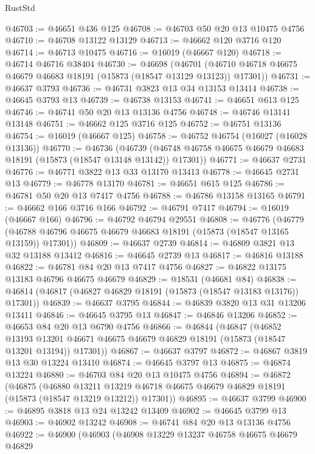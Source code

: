 \begin{lexlean}{RustStd}
\begin{coremodule}
@46703 := @46651 @436 @125
@46708 := @46703 @50 @20 @13 @10475 @4756
@46710 := @46708 @13122 @13129
@46713 := @46662 @120 @3716 @120
@46714 := @46713 @10475
@46716 := @16019 (@46667 @120)
@46718 := @46714 @46716 @38404
@46730 := @46698
    (@46701 (@46710 @46718 @46675 @46679 @46683 @18191 (@15873 (@18547 @13129 @13123)) @17301))
@46731 := @46637 @3793
@46736 := @46731 @3823 @13 @34 @13153 @13414
@46738 := @46645 @3793 @13
@46739 := @46738 @13153
@46741 := @46651 @613 @125
@46746 := @46741 @50 @20 @13 @13136 @4756
@46748 := @46746 @13141 @13148
@46751 := @46662 @125 @3716 @125
@46752 := @46751 @13136
@46754 := @16019 (@46667 @125)
@46758 := @46752 @46754 (@16027 (@16028 @13136))
@46770 := @46736
    (@46739 (@46748 @46758 @46675 @46679 @46683 @18191 (@15873 (@18547 @13148 @13142)) @17301))
@46771 := @46637 @2731
@46776 := @46771 @3822 @13 @33 @13170 @13413
@46778 := @46645 @2731 @13
@46779 := @46778 @13170
@46781 := @46651 @615 @125
@46786 := @46781 @50 @20 @13 @7417 @4756
@46788 := @46786 @13158 @13165
@46791 := @46662 @166 @3716 @166
@46792 := @46791 @7417
@46794 := @16019 (@46667 @166)
@46796 := @46792 @46794 @29551
@46808 := @46776
    (@46779 (@46788 @46796 @46675 @46679 @46683 @18191 (@15873 (@18547 @13165 @13159)) @17301))
@46809 := @46637 @2739
@46814 := @46809 @3821 @13 @32 @13188 @13412
@46816 := @46645 @2739 @13
@46817 := @46816 @13188
@46822 := @46781 @84 @20 @13 @7417 @4756
@46827 := @46822 @13175 @13183 @46796 @46675 @46679
@46829 := @18531 (@46681 @84)
@46838 := @46814 (@46817 (@46827 @46829 @18191 (@15873 (@18547 @13183 @13176)) @17301))
@46839 := @46637 @3795
@46844 := @46839 @3820 @13 @31 @13206 @13411
@46846 := @46645 @3795 @13
@46847 := @46846 @13206
@46852 := @46653 @84 @20 @13 @6790 @4756
@46866 := @46844
    (@46847
      (@46852
        @13193
        @13201
        @46671
        @46675
        @46679
        @46829
        @18191
        (@15873 (@18547 @13201 @13194))
        @17301))
@46867 := @46637 @3797
@46872 := @46867 @3819 @13 @30 @13224 @13410
@46874 := @46645 @3797 @13
@46875 := @46874 @13224
@46880 := @46703 @84 @20 @13 @10475 @4756
@46894 := @46872
    (@46875
      (@46880
        @13211
        @13219
        @46718
        @46675
        @46679
        @46829
        @18191
        (@15873 (@18547 @13219 @13212))
        @17301))
@46895 := @46637 @3799
@46900 := @46895 @3818 @13 @24 @13242 @13409
@46902 := @46645 @3799 @13
@46903 := @46902 @13242
@46908 := @46741 @84 @20 @13 @13136 @4756
@46922 := @46900
    (@46903
      (@46908
        @13229
        @13237
        @46758
        @46675
        @46679
        @46829

\end{coremodule}
\end{lexlean}
